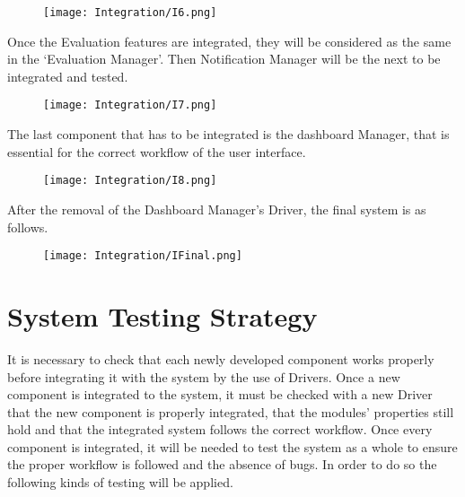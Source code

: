 \begin{figure}[H]
    \begin{center}
        \texttt{[image: Integration/I6.png]}
        \label{fig:Integration_6}%
    \end{center}
\end{figure}

Once the Evaluation features are integrated, they will be considered as the same in the ‘Evaluation Manager’. Then Notification Manager will be the next to be integrated and tested.


\begin{figure}[H]
    \begin{center}
        \texttt{[image: Integration/I7.png]}
        \label{fig:Integration_7}%
    \end{center}
\end{figure}

The last component that has to be integrated is the dashboard Manager, that is essential for the correct workflow of the user interface.


\begin{figure}[H]
    \begin{center}
        \texttt{[image: Integration/I8.png]}
        \label{fig:Integration_8}%
    \end{center}
\end{figure}

After the removal of the Dashboard Manager’s Driver, the final system is as follows.

\begin{figure}[H]
    \begin{center}
        \texttt{[image: Integration/IFinal.png]}
        \label{fig:Integration_final}%
    \end{center}
\end{figure}



\section{System Testing Strategy}

It is necessary to check that each newly developed component works properly before integrating it with the system by the use of Drivers. Once a new component is integrated to the system, it must be checked with a new Driver that the new component is properly integrated, that the modules’ properties still hold and that the integrated system follows the correct workflow. 
Once every component is integrated, it will be needed to test the system as a whole to ensure the proper workflow is followed and the absence of bugs. In order to do so the following kinds of testing will be applied. 

